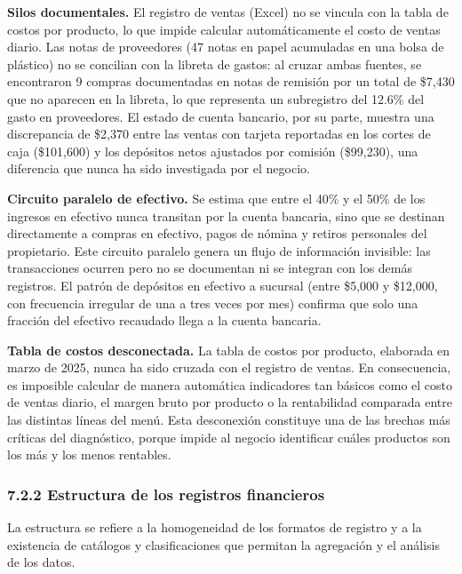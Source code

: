 \documentclass[
  12pt,
  spanish,
]{article}
\begin{document}
\textbf{Silos documentales.} El registro de ventas (Excel) no se vincula
con la tabla de costos por producto, lo que impide calcular
automáticamente el costo de ventas diario. Las notas de proveedores (47
notas en papel acumuladas en una bolsa de plástico) no se concilian con
la libreta de gastos: al cruzar ambas fuentes, se encontraron 9 compras
documentadas en notas de remisión por un total de \$7,430 que no
aparecen en la libreta, lo que representa un subregistro del 12.6\% del
gasto en proveedores. El estado de cuenta bancario, por su parte,
muestra una discrepancia de \$2,370 entre las ventas con tarjeta
reportadas en los cortes de caja (\$101,600) y los depósitos netos
ajustados por comisión (\$99,230), una diferencia que nunca ha sido
investigada por el negocio.

\textbf{Circuito paralelo de efectivo.} Se estima que entre el 40\% y el
50\% de los ingresos en efectivo nunca transitan por la cuenta bancaria,
sino que se destinan directamente a compras en efectivo, pagos de nómina
y retiros personales del propietario. Este circuito paralelo genera un
flujo de información invisible: las transacciones ocurren pero no se
documentan ni se integran con los demás registros. El patrón de
depósitos en efectivo a sucursal (entre \$5,000 y \$12,000, con
frecuencia irregular de una a tres veces por mes) confirma que solo una
fracción del efectivo recaudado llega a la cuenta bancaria.

\textbf{Tabla de costos desconectada.} La tabla de costos por producto,
elaborada en marzo de 2025, nunca ha sido cruzada con el registro de
ventas. En consecuencia, es imposible calcular de manera automática
indicadores tan básicos como el costo de ventas diario, el margen bruto
por producto o la rentabilidad comparada entre las distintas líneas del
menú. Esta desconexión constituye una de las brechas más críticas del
diagnóstico, porque impide al negocio identificar cuáles productos son
los más y los menos rentables.

\hypertarget{estructura-de-los-registros-financieros}{%
\subsubsection{7.2.2 Estructura de los registros
financieros}\label{estructura-de-los-registros-financieros}}

La estructura se refiere a la homogeneidad de los formatos de registro y
a la existencia de catálogos y clasificaciones que permitan la
agregación y el análisis de los datos.
\end{document}
